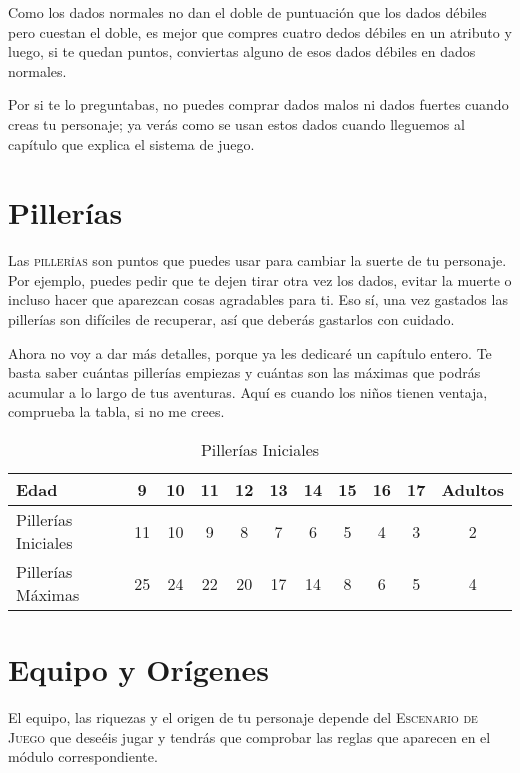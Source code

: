 Como los dados normales no dan el doble de puntuación que los dados débiles pero cuestan el doble, es mejor que compres cuatro dedos débiles en un atributo y luego, si te quedan puntos, conviertas alguno de esos dados débiles en dados normales.

Por si te lo preguntabas, no puedes comprar dados malos ni dados fuertes cuando creas tu personaje; ya verás como se usan estos dados cuando lleguemos al capítulo que explica el sistema de juego.

\section{Pillerías}

Las \textsc{pillerías} son puntos que puedes usar para cambiar la suerte de tu personaje. Por ejemplo, puedes pedir que te dejen tirar otra vez los dados, evitar la muerte o incluso hacer que aparezcan cosas agradables para ti. Eso sí, una vez gastados las pillerías son difíciles de recuperar, así que deberás gastarlos con cuidado.

Ahora no voy a dar más detalles, porque ya les dedicaré un capítulo entero. Te basta saber cuántas pillerías empiezas y cuántas son las máximas que podrás acumular a lo largo de tus aventuras. Aquí es cuando los niños tienen ventaja, comprueba la tabla, si no me crees.

\begin{table}[h]
\begin{tabular}{lcccccccccc}
\toprule
Edad&9&10&11&12&13&14&15&16&17&Adultos\\\midrule
Pillerías Iniciales&11&10&9&8&7&6&5&4&3&2\\\midrule
Pillerías Máximas&25&24&22&20&17&14&8&6&5&4\\\midrule
\bottomrule
\end{tabular}
\caption{Pillerías Iniciales}
\end{table}

\section{Equipo y Orígenes}

El equipo, las riquezas y el origen de tu personaje depende del \textsc{Escenario de Juego} que deseéis jugar y tendrás que comprobar las reglas que aparecen en el módulo correspondiente.

